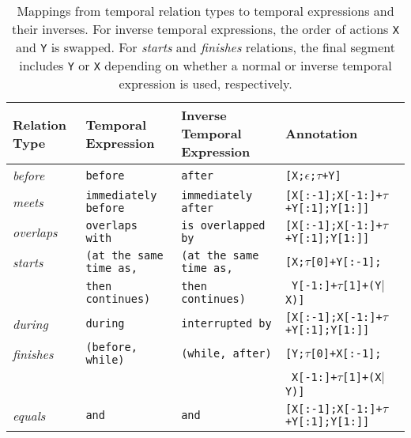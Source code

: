 \begin{table}[t]
	\centering
	\caption{Mappings from temporal relation types to temporal expressions and their inverses. For inverse temporal expressions, the order of actions \texttt{X} and \texttt{Y} is swapped. For \textit{starts} and \textit{finishes} relations, the final segment includes \texttt{Y} or \texttt{X} depending on whether a normal or inverse temporal expression is used, respectively.}
	\label{tab:temp_maps}
    \scriptsize
	\begin{tabular}{llll}
		\toprule
		Relation Type & Temporal Expression & Inverse Temporal Expression & Annotation \\
	\midrule
		\textit{before} & \texttt{before} & \texttt{after} & \texttt{[X;$\epsilon$;$\tau$+Y]}\\
			\textit{meets} & \texttt{immediately before} & \texttt{immediately after} & \texttt{[X[:-1];X[-1:]+$\tau$+Y[:1];Y[1:]]}\\
			\textit{overlaps} & \texttt{overlaps with} & \texttt{is overlapped by} & \texttt{[X[:-1];X[-1:]+$\tau$+Y[:1];Y[1:]]}\\
			\textit{starts} & \texttt{(at the same time as,} & \texttt{(at the same time as,} & \texttt{[X;$\tau$[0]+Y[:-1];}\\
							& \texttt{then continues)} & \texttt{then continues)} & \texttt{ Y[-1:]+$\tau$[1]+(Y$\mid$X)]}\\
			\textit{during} & \texttt{during} & \texttt{interrupted by} & \texttt{[X[:-1];X[-1:]+$\tau$+Y[:1];Y[1:]]}\\
			\textit{finishes} & \texttt{(before, while)} & \texttt{(while, after)} & \texttt{[Y;$\tau$[0]+X[:-1];}\\
							  & & & \texttt{ X[-1:]+$\tau$[1]+(X$\mid$Y)]}\\
			\textit{equals} & \texttt{and} & \texttt{and} & \texttt{[X[:-1];X[-1:]+$\tau$+Y[:1];Y[1:]]}\\
	\bottomrule
	\end{tabular}
\end{table}
\normalsize

%

